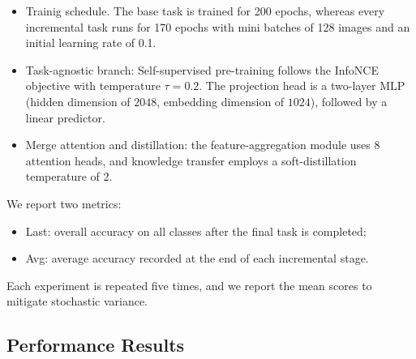 \documentclass[letterpaper]{article} %
\begin{document}
\begin{itemize}
    \item Trainig schedule. The base task is trained for 200 epochs, whereas every incremental task runs for 170 epochs with mini batches of 128 images and an initial learning rate of 0.1.
    \item Task-agnostic branch: Self-supervised pre-training follows the InfoNCE objective with temperature $\tau = 0.2$. The projection head is a two-layer MLP (hidden dimension of $2048$, embedding dimension of $1024$), followed by a linear predictor.
    \item Merge attention and distillation: the feature-aggregation module uses 8 attention heads, and knowledge transfer employs a soft-distillation temperature of 2.
\end{itemize}

We report two metrics:
\begin{itemize}
    \item Last: overall accuracy on all classes after the final task is completed;
    \item Avg: average accuracy recorded at the end of each incremental stage.
\end{itemize}

Each experiment is repeated five times, and we report the mean scores to mitigate stochastic variance.

\subsection{Performance Results}
\end{document}

